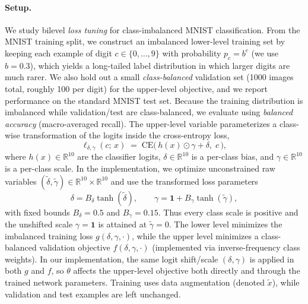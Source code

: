 \documentclass{article}
\theoremstyle{normaltheorem}
\newcommand{\R}{\mathbb{R}}
\begin{document}
\paragraph{Setup.}
We study bilevel \emph{loss tuning} for class-imbalanced MNIST classification.
From the MNIST training split, we construct an imbalanced lower-level training set by keeping each example of digit
$c\in\{0,\ldots,9\}$ with probability $p_c=b^{c}$ (we use $b=0.3$), which yields a long-tailed label distribution in which
larger digits are much rarer.
We also hold out a small \emph{class-balanced} validation set (1000 images total, roughly 100 per digit) for the upper-level
objective, and we report performance on the standard MNIST test set.
Because the training distribution is imbalanced while validation/test are class-balanced, we evaluate using
\emph{balanced accuracy} (macro-averaged recall).
The upper-level variable parameterizes a class-wise transformation of the logits inside the cross-entropy loss,
\[
\ell_{\delta,\gamma}(c;\,x)\;=\;\mathrm{CE}\!\Big(\,h(x)\odot \gamma+\delta,\;c\,\Big),
\]
where $h(x)\in\R^{10}$ are the classifier logits, $\delta\in\R^{10}$ is a per-class bias, and $\gamma\in\R^{10}$ is a
per-class scale. In the implementation, we optimize unconstrained raw variables
\((\tilde\delta,\tilde\gamma)\in\R^{10}\times\R^{10}\) and use the transformed loss parameters
\[
\delta=B_\delta\tanh(\tilde\delta),
\qquad
\gamma=\mathbf 1+B_\gamma\tanh(\tilde\gamma),
\]
with fixed bounds \(B_\delta=0.5\) and \(B_\gamma=0.15\). Thus every class scale is positive and the unshifted scale
\(\gamma=\mathbf 1\) is attained at \(\tilde\gamma=0\).
The lower level minimizes the imbalanced training loss $g(\delta,\gamma,\cdot)$, while the upper level minimizes a
class-balanced validation objective $f(\delta,\gamma,\cdot)$ (implemented via inverse-frequency class weights).
In our implementation, the same logit shift/scale $(\delta,\gamma)$ is applied in both $g$ and $f$, so $\theta$ affects the upper-level objective both directly and through the trained network parameters.
Training uses data augmentation (denoted $\tilde x$), while validation and test examples are left unchanged.
\end{document}
